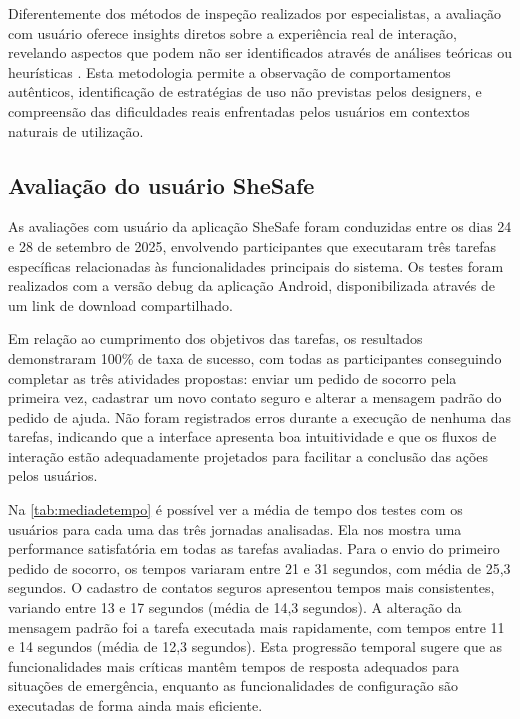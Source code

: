 Diferentemente dos métodos de inspeção realizados por especialistas, a avaliação com usuário oferece insights diretos sobre a experiência real de interação, revelando aspectos que podem não ser identificados através de análises teóricas ou heurísticas \cite{nielsen1994usability}. Esta metodologia permite a observação de comportamentos autênticos, identificação de estratégias de uso não previstas pelos designers, e compreensão das dificuldades reais enfrentadas pelos usuários em contextos naturais de utilização.

\subsection{Avaliação do usuário SheSafe}
As avaliações com usuário da aplicação SheSafe foram conduzidas entre os dias 24 e 28 de setembro de 2025, envolvendo participantes que executaram três tarefas específicas relacionadas às funcionalidades principais do sistema. Os testes foram realizados com a versão debug da aplicação Android, disponibilizada através de um link de download compartilhado.

Em relação ao cumprimento dos objetivos das tarefas, os resultados demonstraram 100\% de taxa de sucesso, com todas as participantes conseguindo completar as três atividades propostas: enviar um pedido de socorro pela primeira vez, cadastrar um novo contato seguro e alterar a mensagem padrão do pedido de ajuda. Não foram registrados erros durante a execução de nenhuma das tarefas, indicando que a interface apresenta boa intuitividade e que os fluxos de interação estão adequadamente projetados para facilitar a conclusão das ações pelos usuários.

Na \autoref{tab:mediadetempo} é possível ver a média de tempo dos testes com os usuários para cada uma das três jornadas analisadas. Ela nos mostra uma performance satisfatória em todas as tarefas avaliadas. Para o envio do primeiro pedido de socorro, os tempos variaram entre 21 e 31 segundos, com média de 25,3 segundos. O cadastro de contatos seguros apresentou tempos mais consistentes, variando entre 13 e 17 segundos (média de 14,3 segundos). A alteração da mensagem padrão foi a tarefa executada mais rapidamente, com tempos entre 11 e 14 segundos (média de 12,3 segundos). Esta progressão temporal sugere que as funcionalidades mais críticas mantêm tempos de resposta adequados para situações de emergência, enquanto as funcionalidades de configuração são executadas de forma ainda mais eficiente.

